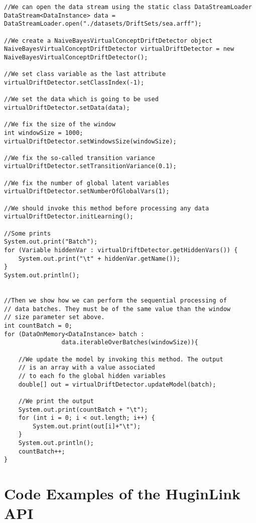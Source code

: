 \begin{lstlisting}
//We can open the data stream using the static class DataStreamLoader
DataStream<DataInstance> data = DataStreamLoader.open("./datasets/DriftSets/sea.arff");

//We create a NaiveBayesVirtualConceptDriftDetector object
NaiveBayesVirtualConceptDriftDetector virtualDriftDetector = new NaiveBayesVirtualConceptDriftDetector();

//We set class variable as the last attribute
virtualDriftDetector.setClassIndex(-1);

//We set the data which is going to be used
virtualDriftDetector.setData(data);

//We fix the size of the window
int windowSize = 1000;
virtualDriftDetector.setWindowsSize(windowSize);

//We fix the so-called transition variance
virtualDriftDetector.setTransitionVariance(0.1);

//We fix the number of global latent variables
virtualDriftDetector.setNumberOfGlobalVars(1);

//We should invoke this method before processing any data
virtualDriftDetector.initLearning();

//Some prints
System.out.print("Batch");
for (Variable hiddenVar : virtualDriftDetector.getHiddenVars()) {
    System.out.print("\t" + hiddenVar.getName());
}
System.out.println();


//Then we show how we can perform the sequential processing of
// data batches. They must be of the same value than the window
// size parameter set above.
int countBatch = 0;
for (DataOnMemory<DataInstance> batch : 
				data.iterableOverBatches(windowSize)){

    //We update the model by invoking this method. The output
    // is an array with a value associated
    // to each fo the global hidden variables
    double[] out = virtualDriftDetector.updateModel(batch);

    //We print the output
    System.out.print(countBatch + "\t");
    for (int i = 0; i < out.length; i++) {
        System.out.print(out[i]+"\t");
    }
    System.out.println();
    countBatch++;
}
\end{lstlisting}

\chapter{Code Examples of the HuginLink API}\label{sec:codeExamples}

